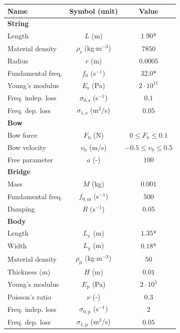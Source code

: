 \documentclass[dvipsnames, pdftex]{article}
\begin{document}
\begin{table}[t]\label{tab:parameters}
\small
\begin{center}
\begin{tabular}{|l|c|c|}
    \hline
    Name & Symbol (unit) & Value\\ \hline
    \multicolumn{3}{|l|}{\bf String}\\ \hline
    Length & $L$ (m) & $1.90$*\\
    Material density & $\rho_\text{s}$ (kg$\cdot$m$^{-3}$) & $7850$\\ 
    Radius & $r$ (m) & $0.0005$\\
    Fundamental freq. & $f_0$ (s$^{-1}$)& $32.0$*\\ 
    Young's modulus & $E_\text{s}$ (Pa) & $2\cdot 10^{11}$\\
    Freq. indep. loss & $\sigma_{0,\text{s}}$ (s$^{-1}$) & $0.1$\\ 
    Freq. dep. loss & $\sigma_{1,\text{s}}$ (m$^2$/s) & $0.05$\\ \hline
    \multicolumn{3}{|l|}{\bf Bow}\\ \hline
    Bow force & $F_\text{b}$ (N) & $0 \leq F_\text{b} \leq 0.1 $\\
    Bow velocity & $v_\text{b}$ (m/s) & $-0.5 \leq v_\text{b} \leq 0.5 $\\
    Free parameter & $a$ (-) & $100$\\\hline
    \multicolumn{3}{|l|}{\bf Bridge}\\ \hline
    Mass & $M$ (kg) & $0.001$\\ 
    Fundamental freq. & $f_{0,\text{m}}$ (s$^{-1}$) & $500$\\ 
    Damping & $R$ (s$^{-1}$)& $0.05$\\
    \hline
    \multicolumn{3}{|l|}{\bf Body}\\ \hline
    Length & $L_x$ (m)& $1.35$*\\ 
    Width & $L_y$ (m)& $0.18$*\\ 
    Material density & $\rho_\text{p}$ (kg$\cdot$m$^{-3}$)& $50$\\ 
    Thickness (m) & $H$ (m) & $0.01$\\ 
    Young's modulus & $E_\text{p}$ (Pa) & $2\cdot 10^{5}$\\ 
    Poisson's ratio & $\nu$ (-)& $0.3$\\
    Freq. indep. loss & $\sigma_{0,\text{p}}$ (s$^{-1}$)& $2$\\
    Freq. dep. loss & $\sigma_{1,\text{p}}$ (m$^2$/s)& $0.05$\\ \hline

\end{tabular}
\end{center}
\end{table}
\end{document}
